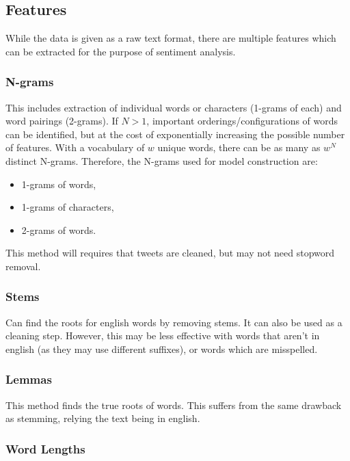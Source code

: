 \documentclass[11pt]{article}
\begin{document}
\subsection{Features}\label{subsection:tokens}

While the data is given as a raw text format, there are multiple features which can be extracted for the purpose of sentiment analysis.

\subsubsection{N-grams}

This includes extraction of individual words or characters (1-grams of each) and word pairings (2-grams).
If $N > 1$, important orderings/configurations of words can be identified, but at the cost of exponentially increasing the possible number of features.
With a vocabulary of $w$ unique words, there can be as many as $w^N$ distinct N-grams.
Therefore, the N-grams used for model construction are:
\begin{itemize}
	\item 1-grams of words,
	\item 1-grams of characters,
	\item 2-grams of words.
\end{itemize}

This method will requires that tweets are cleaned, but may not need stopword removal.

\subsubsection{Stems}\label{sec:stems}
Can find the roots for english words by removing stems. It can also be used as a cleaning step.
However, this may be less effective with words that aren't in english (as they may use different suffixes),
or words which are misspelled.

\subsubsection{Lemmas}\label{sec:lemmas}
This method finds the true roots of words. This suffers from the same drawback as stemming, relying the text being in english.

\subsubsection{Word Lengths}
\end{document}
